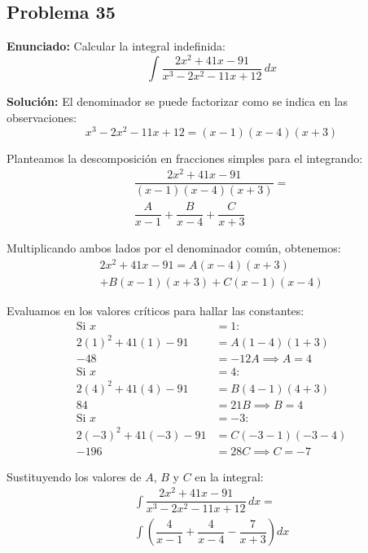 \subsection*{Problema 35}

\textbf{Enunciado:}
Calcular la integral indefinida:
\begin{equation*}
\int \dfrac{2x^2 + 41x - 91}{x^3 - 2x^2 - 11x + 12} \, dx
\end{equation*}

\textbf{Solución:}
El denominador se puede factorizar como se indica en las observaciones:
\begin{equation*}
x^3 - 2x^2 - 11x + 12 = (x - 1)(x - 4)(x + 3)
\end{equation*}

Planteamos la descomposición en fracciones simples para el integrando:
\begin{multline*}
\dfrac{2x^2 + 41x - 91}{(x - 1)(x - 4)(x + 3)} = \\
\dfrac{A}{x - 1} + \dfrac{B}{x - 4} + \dfrac{C}{x + 3}
\end{multline*}

Multiplicando ambos lados por el denominador común, obtenemos:
\begin{multline*}
2x^2 + 41x - 91 = A(x - 4)(x + 3) \\
+ B(x - 1)(x + 3) + C(x - 1)(x - 4)
\end{multline*}

Evaluamos en los valores críticos para hallar las constantes:
\begin{align*}
\text{Si } x &= 1: \\
2(1)^2 + 41(1) - 91 &= A(1 - 4)(1 + 3) \\
-48 &= -12A \implies A = 4 \\
\text{Si } x &= 4: \\
2(4)^2 + 41(4) - 91 &= B(4 - 1)(4 + 3) \\
84 &= 21B \implies B = 4 \\
\text{Si } x &= -3: \\
2(-3)^2 + 41(-3) - 91 &= C(-3 - 1)(-3 - 4) \\
-196 &= 28C \implies C = -7
\end{align*}

Sustituyendo los valores de $A$, $B$ y $C$ en la integral:
\begin{multline*}
\int \dfrac{2x^2 + 41x - 91}{x^3 - 2x^2 - 11x + 12} \, dx = \\
\int \left( \dfrac{4}{x - 1} + \dfrac{4}{x - 4} - \dfrac{7}{x + 3} \right) dx
\end{multline*}

